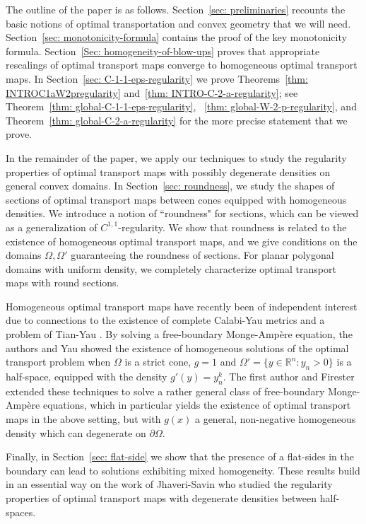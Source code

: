 \documentclass[12pt,reqno]{amsart}
\newcommand{\del}{\partial}
\numberwithin{equation}{section}
\begin{document}
 The outline of the paper is as follows.  Section~\ref{sec: preliminaries} recounts the basic notions of optimal transportation and convex geometry that we will need.  Section~\ref{sec: monotonicity-formula} contains the proof of the key monotonicity formula. Section~\ref{Sec: homogeneity-of-blow-ups} proves that appropriate rescalings of optimal transport maps converge to homogeneous optimal transport maps.  In Section~\ref{sec: C-1-1-eps-regularity} we prove Theorems~\ref{thm: INTROC1aW2pregularity} and~\ref{thm: INTRO-C-2-a-regularity}; see Theorem~\ref{thm: global-C-1-1-eps-regularity}, ~\ref{thm: global-W-2-p-regularity}, and Theorem~\ref{thm: global-C-2-a-regularity} for the more precise statement that we prove.

 In the remainder of the paper, we apply our techniques to study the regularity properties of optimal transport maps with possibly degenerate densities on general convex domains.  In Section~\ref{sec: roundness}, we study the shapes of sections of optimal transport maps between cones equipped with homogeneous densities.  We introduce a notion of ``roundness" for sections, which can be viewed as a generalization of $C^{1,1}$-regularity.  We show that roundness is related to the existence of homogeneous optimal transport maps, and we give conditions on the domains $\Omega, \Omega'$ guaranteeing the roundness of sections.  For planar polygonal domains with uniform density, we completely characterize optimal transport maps with round sections. 

Homogeneous optimal transport maps have recently been of independent interest due to connections to the existence of complete Calabi-Yau metrics \cite{Collins-Li, Collins-Tong-Yau} and a problem of Tian-Yau \cite{Tian-Yau, YauICM}.  By solving a free-boundary Monge-Amp\`ere equation, the authors and Yau \cite{Collins-Tong-Yau} showed the existence of homogeneous solutions of the optimal transport problem when $\Omega$ is a strict cone, $g=1$ and $\Omega'= \{y \in \mathbb{R}^n: y_n>0\}$ is a half-space, equipped with the density $g'(y)=y_n^{k}$.  The first author and Firester \cite{Collins-Firester} extended these techniques to solve a rather general class of free-boundary Monge-Amp\`ere equations, which in particular yields the existence of optimal transport maps in the above setting, but with $g(x)$ a general, non-negative homogeneous density which can degenerate on $\del \Omega$.

Finally, in Section~\ref{sec: flat-side} we show that the presence of a flat-sides in the boundary can lead to solutions exhibiting mixed homogeneity.  These results build in an essential way on the work of Jhaveri-Savin \cite{Jhaveri-Savin} who studied the regularity properties of optimal transport maps with degenerate densities between half-spaces.  
\end{document}
